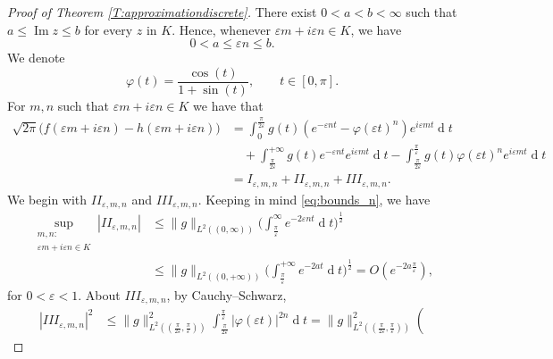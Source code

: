 \documentclass[12pt,a4paper,reqno]{amsart}
\theoremstyle{definition}
\theoremstyle{definition}\newtheorem{defn}[thm]{Definition}
\begin{document}
    \begin{proof}[Proof of Theorem \ref{T:approximationdiscrete}]
    There exist $0<a<b<\infty$ such that
    \(
    a\leqslant\operatorname{Im}z\leqslant b
    \) for every $z$ in $K$. Hence, whenever $\varepsilon m+i\varepsilon n\in K$, we  have 
    \begin{equation}\label{eq:bounds_n}
    0<a\leqslant\varepsilon n\leqslant b.
    \end{equation}
    We denote
    \[
    \varphi(t)=\frac{\cos(t)}{1+\sin(t)}, \qquad t\in[0,\pi].
    \]
    For $m,n$ such that $\varepsilon m+i\varepsilon n\in K$ we have that
    \begin{align*}
    \sqrt{2\pi}\big(f(\varepsilon m+i\varepsilon n)-h(\varepsilon m+i\varepsilon n)\big)
    &= \int_0^{\frac{\pi}{2\varepsilon}}
    g(t)
    (
    e^{-\varepsilon nt}-\varphi(\varepsilon t)^n
    )e^{i\varepsilon mt}\operatorname{d}\!t\\
    &\quad +  \int_{\frac{\pi}{2\varepsilon}}^{+\infty} g(t) e^{-\varepsilon n t }e^{i\varepsilon m t}\operatorname{d}\!t-
    \int_{\frac{\pi}{2\varepsilon}}^{\frac\pi\varepsilon} g(t)\varphi(\varepsilon t)^ne^{i\varepsilon m t}\operatorname{d}\!t\\
    &=I_{\varepsilon,m,n}
    +
    I\!I_{\varepsilon,m,n} 
    +
    I\!I\!I_{\varepsilon,m,n} 
    .
    \end{align*}
    We begin with $I\!I_{\varepsilon,m,n}$ and $
    I\!I\!I_{\varepsilon,m,n}$. Keeping in mind \eqref{eq:bounds_n}, we have
    \begin{align}\label{eq:II_bounds}
    \nonumber\sup_{\substack{m,n:\\
    \varepsilon m+i\varepsilon n\in K}} |I\!I_{\varepsilon,m,n}|&
    \leqslant \|g\|_{L^2((0,\infty))}\Big(\int_{\frac \pi{\varepsilon}}^{\infty}e^{-2\varepsilon n t}\operatorname{d}\!t\Big)^\frac{1}{2}\\
    &\leqslant \|g\|_{L^2((0,+\infty))}\Big(\int_{\frac \pi{\varepsilon}}^{+\infty}e^{-2a t}\operatorname{d}\!t\Big)^\frac{1}{2}=O(e^{-2a\frac{\pi}{\varepsilon}}),
    \end{align}
    for $0<\varepsilon<1$. About $
    I\!I\!I_{\varepsilon,m,n}$, by Cauchy--Schwarz,
    \begin{align}\label{Eq:IIIpt1}
        |I\!I\!I_{\varepsilon,m,n}|^2&\leqslant
        \|g\|_{L^2((\frac{\pi}{2\varepsilon},\frac{\pi}{\varepsilon}))}^2
        \int_{\frac{\pi}{2\varepsilon}}^{\frac{\pi}{\varepsilon}}
    |\varphi(\varepsilon t)|^{2n}
    \operatorname{d}\!t=
    \|g\|_{L^2((\frac{\pi}{2\varepsilon},\frac{\pi}{\varepsilon}))}^2\left(

\end{align}
\end{proof}
\end{document}
